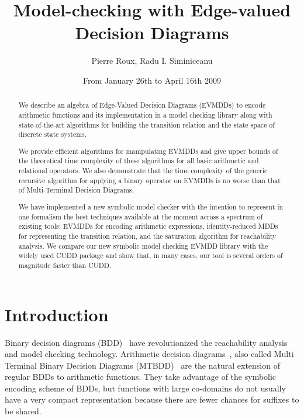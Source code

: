 \documentclass[a4paper,oneside,11pt,pdftex]{llncs}
\title{Model-checking with Edge-valued Decision Diagrams}
\author{Pierre Roux\inst{1}, Radu I. Siminiceanu\inst{2}}
\date{From January 26th to April 16th 2009}
\institute{École Normale Supérieure de Lyon, France
  \email{pierre.roux@ens-lyon.fr}
  \and
  National Institute of Aerospace, Hampton,
  Virginia~23666, USA.
  \email{radu@nianet.org}
}
\begin{document}

\maketitle


\begin{abstract}

We describe an algebra of Edge-Valued Decision Diagrams (EVMDDs) to 
encode arithmetic functions and its implementation in a model checking 
library along with state-of-the-art algorithms for building the 
transition relation and the state space of discrete state systems.

We provide efficient algorithms for manipulating EVMDDs and give upper 
bounds of the theoretical time complexity of these algorithms for all 
basic arithmetic and relational operators. We also demonstrate that the 
time complexity of the generic recursive algorithm for applying a binary 
operator on EVMDDs is no worse than that of Multi-Terminal Decision 
Diagrams.

We have implemented a new symbolic model checker with the intention to 
represent in one formalism the best techniques available at the moment 
across a spectrum of existing tools: EVMDDs for encoding arithmetic 
expressions, identity-reduced MDDs for representing the transition 
relation, and the saturation algorithm for reachability analysis. We 
compare our new symbolic model checking EVMDD library with the widely 
used CUDD package and show that, in many cases, our tool is several 
orders of magnitude faster than CUDD.


\end{abstract}

\section{Introduction}

Binary decision diagrams (BDD)~\cite{Bryant1986} have revolutionized the 
reachability analysis and model checking technology.
%
Arithmetic decision diagrams~\cite{Somenzi1993}, also called
Multi Terminal Binary Decision Diagrams (MTBDD)~\cite{Clarke1995} are the 
natural extension of regular BDDs to arithmetic functions.
They take advantage of the symbolic encoding scheme of BDDs, but 
functions with large co-domains do not usually have a very compact 
representation because there are fewer chances for suffixes to be shared.
\end{document}
